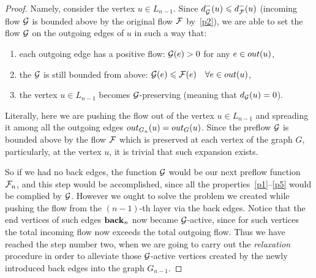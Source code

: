 \documentclass[12pt]{article}
\begin{document}
\begin{proof}
      Namely, consider the vertex $u \in L_{n-1}$.
      Since $d_{\cal{G}}^{-}(u) \leq d_{\flowpos}^{-}(u)$ (incoming flow $\cal{G}$ is bounded above by the original flow $\flowpos$ by~\ref{p2}),
        we are able to set the flow $\cal{G}$ on the outgoing edges of $u$ in such a way that:
      \begin{enumerate}[label=\textbf{(\roman*)}]
        \item\label{posprop} each outgoing edge has a positive flow: $\cal{G}(e) > 0$ for any $e \in \eout(u)$,
        \item the $\cal{G}$ is still bounded from above: 
          $\cal{G}(e) \leq \flowpos(e) \quad \forall e \in \eout(u)$,
        \item the vertex $u \in L_{n-1}$ becomes $\cal{G}$-preserving (meaning that $d_{\cal{G}}(u) = 0$).
      \end{enumerate}
      \begin{note}
        Literally, here we are pushing the flow out of the vertex $u \in L_{n-1}$ and spreading it among all the outgoing edges
          $\eout_{G_n}(u) = \eout_G(u)$.
        Since the preflow $\cal{G}$ is bounded above by the flow $\flowpos$ which is preserved at each vertex of the graph $G$,
          particularly, at the vertex $u$, it is trivial that such expansion exists.
      \end{note}
      So if we had no back edges, the function $\cal{G}$ would be our next preflow function $\flowposn{n}$, and this step would be accomplished,
        since all the properties~\ref{p1}--\ref{p5} would be complied by $\cal{G}$.
      However we ought to solve the problem we created while pushing the flow from the $(n-1)$-th layer via the back edges.
      Notice that the end vertices of such edges $\eback_{n}$ now became $\cal{G}$-active, since for such vertices
        the total incoming flow now exceeds the total outgoing flow. 
      Thus we have reached the step number two, when we are going to carry out the \emph{relaxation} procedure
        in order to alleviate those $\cal{G}$-active vertices created by the newly introduced back edges into the graph $G_{n-1}$.


\end{proof}
\end{document}
